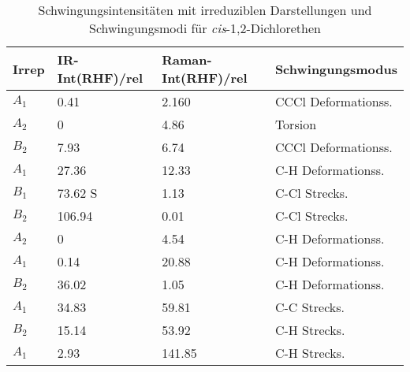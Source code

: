 \documentclass[12pt]{article}
\begin{document}
\begin{onehalfspace}
\begin{table}[!htpb]
\caption{Schwingungsintensitäten mit irreduziblen Darstellungen und Schwingungsmodi für
\textit{cis}-1,2-Dichlorethen}
\begin{tabular}{llll}
\midrule
Irrep & IR-Int(RHF)/rel & Raman-Int(RHF)/rel & Schwingungsmodus \supercite{ciselec} \\
\midrule
$A _1$ & 0.41 & 2.160   & CCCl Deformationss.\\
$A _2$ & 0 & 4.86       & Torsion\\
$B _2$ & 7.93 & 6.74    &  CCCl Deformationss.\\
$A _1$ & 27.36 & 12.33  & C-H Deformationss.\\
$B _1$ & 73.62 S & 1.13   & C-Cl Strecks.\\
$B _2$ & 106.94 & 0.01  & C-Cl Strecks.\\
$A _2$ & 0 & 4.54       & C-H Deformationss.\\
$A _1$ & 0.14 & 20.88   & C-H Deformationss.\\
$B _2$ & 36.02 & 1.05   & C-H Deformationss.\\
$A _1$ & 34.83 & 59.81  & C-C Strecks.\\
$B _2$ & 15.14 & 53.92  & C-H Strecks.\\
$A _1$ & 2.93 & 141.85  & C-H Strecks.\\
\bottomrule
\end{tabular}
\label{tab:cisschwings}

\end{table}











\end{onehalfspace}
\end{document}
